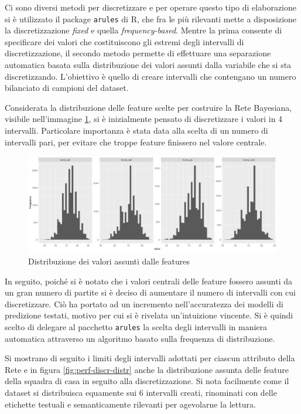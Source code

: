 \documentclass[hidelinks, 12pt]{article}
\begin{document}
Ci sono diversi metodi per discretizzare e per operare questo tipo di elaborazione si è utilizzato il package \texttt{arules} di R, che fra le più rilevanti mette a disposizione la discretizzazione \textit{fixed} e quella \textit{frequency-based}. Mentre la prima consente di specificare dei valori che costituiscono gli estremi degli intervalli di discretizzazione, il secondo metodo permette di effettuare una separazione automatica basata sulla distribuzione dei valori assunti dalla variabile che si sta discretizzando. L'obiettivo è quello di creare intervalli che contengano un numero bilanciato di campioni del dataset.

Considerata la distribuzione delle feature scelte per costruire la Rete Bayesiana, visibile nell'immagine \ref{fig:perf-scores-distr}, si è inizialmente pensato di discretizzare i valori in 4 intervalli. Particolare importanza è stata data alla scelta di un numero di intervalli pari, per evitare che troppe feature finissero nel valore centrale.

\begin{figure}[H]
	\centering
	\includegraphics[scale=0.47]{images/06_03_score_distr.png}
	\caption[Distribuzione dei valori assunti dalle features]{Distribuzione dei valori assunti dalle features}
	\label{fig:perf-scores-distr}
\end{figure}

In seguito, poiché si è notato che i valori centrali delle feature fossero assunti da un gran numero di partite si è deciso di aumentare il numero di intervalli con cui discretizzare. Ciò ha portato ad un incremento nell'accuratezza dei modelli di predizione testati, motivo per cui si è rivelata un'intuizione vincente. Si è quindi scelto di delegare al pacchetto \texttt{arules} la scelta degli intervalli in maniera automatica attraverso un algoritmo basato sulla frequenza di distribuzione.

Si mostrano di seguito i limiti degli intervalli adottati per ciascun attributo della Rete e in figura \ref{fig:perf-discr-distr} anche la distribuzione assunta delle feature della squadra di casa in seguito alla discretizzazione. Si nota facilmente come il dataset si distribuisca equamente sui 6 intervalli creati, rinominati con delle etichette testuali e semanticamente rilevanti per agevolarne la lettura.
\end{document}
